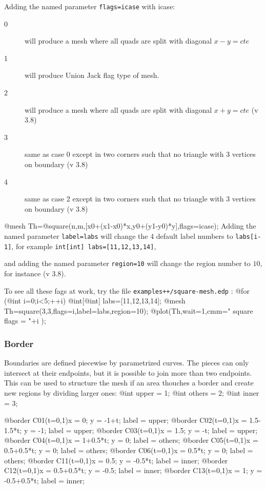 \documentclass[a4paper,twoside,12pt]{book}
\def\setS#1{#1\label{sec:#1}}
\begin{document}
\eFF

\begin{note}
Adding the  named  parameter \texttt{flags=icase} with icase:
\begin{description}
\item[0] will produce a mesh where all quads are split with diagonal $ x-y=cte$
\item[1] will produce Union Jack flag type of mesh.
\item[2] will produce a mesh where all quads are split with diagonal $ x+y=cte$ (v 3.8)
\item[3] same as case 0  except in two corners such that no triangle with 3 vertices on boundary (v 3.8)
\item[4] same as case 2  except in two corners such that no triangle with 3 vertices on boundary (v 3.8)
\end{description}
\bFF
  @mesh Th=@square(n,m,[x0+(x1-x0)*x,y0+(y1-y0)*y],flags=icase);
\eFF
Adding the  named  parameter \texttt{label=labs} will change the 4 default
label numbers to \texttt{labs[i-1]}, for example \texttt{int[int] labs=[11,12,13,14]},

and adding the  named parameter \texttt{region=10} will change  the region number  to $10$,  for instance (v 3.8).

To see all these fags at work,  try the file \texttt{examples++/square-mesh.edp} :
\bFF
@for (@int i=0;i<5;++i)
  {
    @int[@int] labs=[11,12,13,14];
    @mesh Th=square(3,3,flags=i,label=labs,region=10);
    @plot(Th,wait=1,cmm=" square flags = "+i );
   }
\eFF

\end{note}


\subsubsection{\setS{Border}}

Boundaries are defined piecewise by parametrized curves.
The pieces can only intersect at their endpoints, but it is possible to 
join more than two endpoints. This can be used to structure the mesh
if an area thouches a border and create new regions by dividing larger ones:
\bFF
@int upper = 1;
@int others = 2;
@int inner = 3;

@border C01(t=0,1){x = 0;         y = -1+t;        label = upper;}
@border C02(t=0,1){x = 1.5-1.5*t; y = -1;          label = upper;}
@border C03(t=0,1){x = 1.5;       y = -t;          label = upper;}
@border C04(t=0,1){x = 1+0.5*t;   y = 0;           label = others;}
@border C05(t=0,1){x = 0.5+0.5*t; y = 0;           label = others;}
@border C06(t=0,1){x = 0.5*t;     y = 0;           label = others;}
@border C11(t=0,1){x = 0.5;       y = -0.5*t;      label = inner;}
@border C12(t=0,1){x = 0.5+0.5*t; y = -0.5;        label = inner;}
@border C13(t=0,1){x = 1;         y = -0.5+0.5*t;  label = inner;}
\end{document}
